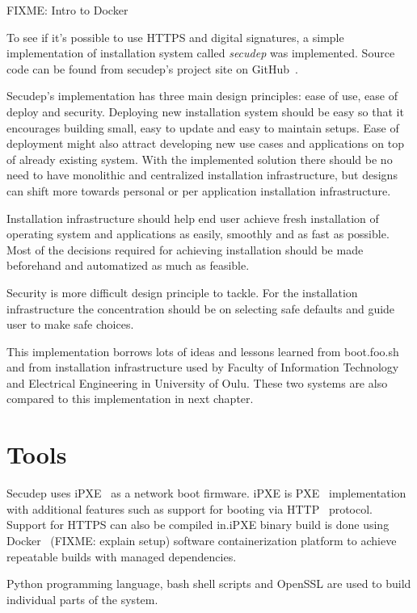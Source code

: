 
FIXME: Intro to Docker

To see if it's possible to use HTTPS and digital signatures, a simple
implementation of installation system called \emph{secudep} was
implemented. Source code can be found from secudep's project site on
GitHub~\cite{secudep}.

Secudep's implementation has three main design principles: ease of
use, ease of deploy and security. Deploying new installation system
should be easy so that it encourages building small, easy to update
and easy to maintain setups. Ease of deployment might also attract
developing new use cases and applications on top of already existing
system. With the implemented solution there should be no need to have
monolithic and centralized installation infrastructure, but designs
can shift more towards personal or per application installation
infrastructure.

Installation infrastructure should help end user achieve fresh
installation of operating system and applications as easily, smoothly
and as fast as possible. Most of the decisions required for achieving
installation should be made beforehand and automatized as much as
feasible.

Security is more difficult design principle to tackle. For the
installation infrastructure the concentration should be on selecting
safe defaults and guide user to make safe choices.

This implementation borrows lots of ideas and lessons learned from
boot.foo.sh\cite{boot-foo-sh} and from installation infrastructure
used by Faculty of Information Technology and Electrical Engineering
in University of Oulu. These two systems are also compared to this
implementation in next chapter.

\section{Tools}

Secudep uses iPXE~\cite{iPXE} as a network boot firmware. iPXE is
PXE~\cite{PXEspec} implementation with additional features such as
support for booting via HTTP~\cite{RFC2616} protocol. Support for
HTTPS can also be compiled in.\@ iPXE binary build is done using
Docker~\cite{Docker} (FIXME: explain setup) software containerization
platform to achieve repeatable builds with managed dependencies.

Python programming language, bash shell scripts and OpenSSL are used
to build individual parts of the system.

